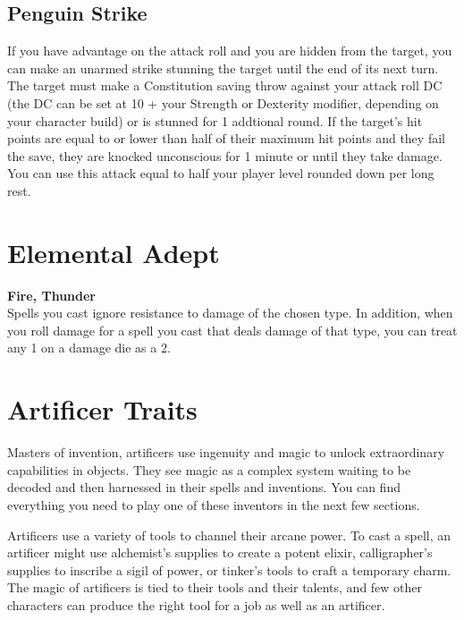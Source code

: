 {\subsection*{Penguin Strike}
If you have advantage on the attack roll and you are hidden from the target, you can make an unarmed strike stunning the target until the end of its next turn. The target must make a Constitution saving throw against your attack roll DC (the DC can be set at 10 + your Strength or Dexterity modifier, depending on your character build) or is stunned for 1 addtional round. If the target's hit points are equal to or lower than half of their maximum hit points and they fail the save, they are knocked unconscious for 1 minute or until they take damage. You can use this attack equal to half your player level rounded down per long rest.

\section*{Elemental Adept}
\textbf{Fire, Thunder}\\
Spells you cast ignore resistance to damage of the chosen type. In addition, when you roll damage for a spell you cast that deals damage of that type, you can treat any 1 on a damage die as a 2.

\section*{Artificer Traits}
Masters of invention, artificers use ingenuity and magic to unlock extraordinary capabilities in objects. They see magic as a complex system waiting to be decoded and then harnessed in their spells and inventions. You can find everything you need to play one of these inventors in the next few sections.

Artificers use a variety of tools to channel their arcane power. To cast a spell, an artificer might use alchemist's supplies to create a potent elixir, calligrapher's supplies to inscribe a sigil of power, or tinker's tools to craft a temporary charm. The magic of artificers is tied to their tools and their talents, and few other characters can produce the right tool for a job as well as an artificer.
}
